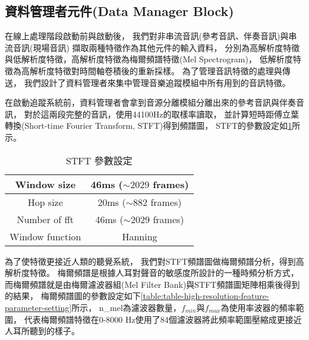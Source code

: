 \documentclass[class=NCU_thesis, crop=false]{standalone}
\begin{document}


\subsection{資料管理者元件(Data Manager Block)} \label{ch3-subst-data-manager}
在線上處理階段啟動前與啟動後，
我們對非串流音訊(參考音訊、伴奏音訊)與串流音訊(現場音訊)
擷取兩種特徵作為其他元件的輸入資料，
分別為高解析度特徵與低解析度特徵，高解析度特徵為梅爾頻譜特徵(Mel Spectrogram)，
低解析度特徵為高解析度特徵對時間軸卷積後的重新採樣。
為了管理音訊特徵的處理與傳送，
我們設計了資料管理者來集中管理音樂追蹤模組中所有用到的音訊特徵。

在啟動追蹤系統前，資料管理者會拿到音源分離模組分離出來的參考音訊與伴奏音訊，
對於這兩段完整的音訊，使用44100Hz的取樣率讀取，
並計算短時距傅立葉轉換(Short-time Fourier Transform, STFT)得到頻譜圖，
STFT的參數設定如\cref{table:table-stft-parameter-setting}所示。

\begin{table}[h]
    \centering
    \caption{STFT 參數設定}
    \label{table:table-stft-parameter-setting}
    \begin{tabular}{|c|c|}
        \hline
        \multicolumn{1}{|c|}{Window size} & \multicolumn{1}{|c|}{46ms ($\sim 2029$ frames)}\\
        \hline
        Hop size & 20ms ($\sim 882$ frames)\\
        \hline
        Number of fft & 46ms ($\sim 2029$ frames)\\
        \hline
        Window function & Hanning \\
        \hline
    \end{tabular}
\end{table}

為了使特徵更接近人類的聽覺系統，
我們對STFT頻譜圖做梅爾頻譜分析，得到高解析度特徵。
梅爾頻譜是根據人耳對聲音的敏感度所設計的一種時頻分析方式，
而梅爾頻譜就是由梅爾濾波器組(Mel Filter Bank)與STFT頻譜圖矩陣相乘後得到的結果，
梅爾頻譜圖的參數設定如下\cref{table:table-high-resolution-feature-parameter-setting}所示，
n\_mel為濾波器數量，$f_{min}$與$f_{max}$為使用率波器的頻率範圍，
代表梅爾頻譜特徵在0-8000 Hz使用了84個濾波器將此頻率範圍壓縮成更接近人耳所聽到的樣子。
\end{document}
